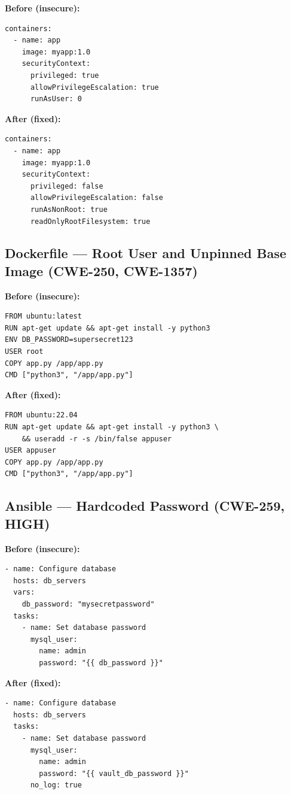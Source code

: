 \documentclass[11pt,a4paper]{article}
\begin{document}
\textbf{Before (insecure):}
\begin{lstlisting}[style=iac]
containers:
  - name: app
    image: myapp:1.0
    securityContext:
      privileged: true
      allowPrivilegeEscalation: true
      runAsUser: 0
\end{lstlisting}

\textbf{After (fixed):}
\begin{lstlisting}[style=iac]
containers:
  - name: app
    image: myapp:1.0
    securityContext:
      privileged: false
      allowPrivilegeEscalation: false
      runAsNonRoot: true
      readOnlyRootFilesystem: true
\end{lstlisting}

\subsection{Dockerfile --- Root User and Unpinned Base Image (CWE-250, CWE-1357)}

\textbf{Before (insecure):}
\begin{lstlisting}[style=iac]
FROM ubuntu:latest
RUN apt-get update && apt-get install -y python3
ENV DB_PASSWORD=supersecret123
USER root
COPY app.py /app/app.py
CMD ["python3", "/app/app.py"]
\end{lstlisting}

\textbf{After (fixed):}
\begin{lstlisting}[style=iac]
FROM ubuntu:22.04
RUN apt-get update && apt-get install -y python3 \
    && useradd -r -s /bin/false appuser
USER appuser
COPY app.py /app/app.py
CMD ["python3", "/app/app.py"]
\end{lstlisting}

\subsection{Ansible --- Hardcoded Password (CWE-259, HIGH)}

\textbf{Before (insecure):}
\begin{lstlisting}[style=iac]
- name: Configure database
  hosts: db_servers
  vars:
    db_password: "mysecretpassword"
  tasks:
    - name: Set database password
      mysql_user:
        name: admin
        password: "{{ db_password }}"
\end{lstlisting}

\textbf{After (fixed):}
\begin{lstlisting}[style=iac]
- name: Configure database
  hosts: db_servers
  tasks:
    - name: Set database password
      mysql_user:
        name: admin
        password: "{{ vault_db_password }}"
      no_log: true
\end{lstlisting}
\end{document}
